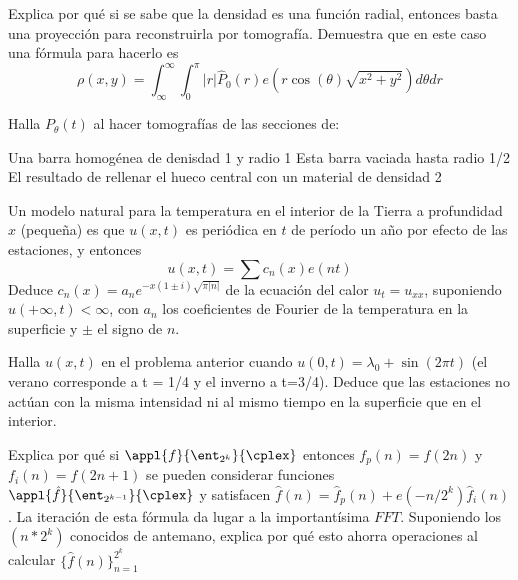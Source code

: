 \begin{problem}[14]
Explica por qué si se sabe que la densidad es una función radial, entonces basta una proyección para reconstruirla por tomografía. Demuestra que en este caso una fórmula para hacerlo es
\[ρ(x,y)=\int_{\infty}^{\infty} \int_0^π |r|\hat{P}_0(r)e(r\cos(\theta) \sqrt{x^2+y^2})d\theta dr\]
\solution

\end{problem}

\begin{problem}[15]
Halla $P_{\theta}(t)$ al hacer tomografías de las secciones de:

\ppart Una barra homogénea de denisdad 1 y radio 1
\ppart Esta barra vaciada hasta radio 1/2
\ppart El resultado de rellenar el hueco central con un material de densidad 2
\solution

\end{problem}

\begin{problem}[16]
Un modelo natural para la temperatura en el interior de la Tierra a profundidad $x$ (pequeña) es que $u(x,t)$ es periódica en $t$ de período un año por efecto de las estaciones, y entonces
\[u(x,t)=\sum c_n(x)e(nt)\]
Deduce $c_n(x)=a_ne^{-x(1\pm i)\sqrt{π|n|}}$ de la ecuación del calor $u_t=u_{xx}$, suponiendo $u(+\infty, t)< \infty$, con $a_n$ los coeficientes de Fourier de la temperatura en la superficie y $\pm$ el signo de $n$.
\solution


\end{problem}

\begin{problem}[17]
Halla $u(x,t)$ en el problema anterior cuando $u(0,t)=λ_0+\sin(2πt)$ (el verano corresponde a t = 1/4 y el inverno a t=3/4). Deduce que las estaciones no actúan con la misma intensidad ni al mismo tiempo en la superficie que en el interior.
\solution

\end{problem}

\begin{problem}[18]
Explica por qué si $\appl{f}{\ent_{2^k}}{\cplex}$ entonces $f_p(n)=f(2n)$ y $f_i(n)=f(2n+1)$ se pueden considerar funciones $\appl{\hat{f}}{\ent_{2^{k-1}}}{\cplex}$ y satisfacen $\hat{f}(n)=\hat{f}_p(n)+e(-n/2^k)\hat{f}_i(n)$. La iteración de esta fórmula da lugar a la importantísima $FFT$. Suponiendo los $(n*2^k)$ conocidos de antemano, explica por qué esto ahorra operaciones al calcular $\{\hat{f}(n)\}_{n=1}^{2^k}$
\solution
\end{problem}




